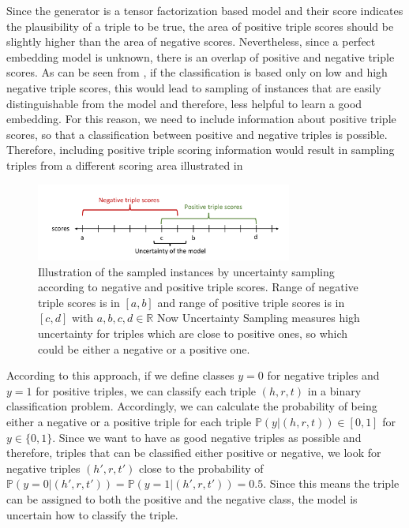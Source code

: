 Since the generator is a tensor factorization based model and their score indicates the plausibility of a triple to be true, the area of positive triple scores should be slightly higher than the area of negative scores.
Nevertheless, since a perfect embedding model is unknown, there is an overlap of positive and negative triple scores.
As can be seen from , if the classification is based only on low and high negative triple scores, this would lead to sampling of instances that are easily distinguishable from the model and therefore, less helpful to learn a good embedding.
For this reason, we need to include information about positive triple scores, so that a classification between positive and negative triples is possible.
Therefore, including positive triple scoring information would result in sampling triples from a different scoring area illustrated in 
\begin{figure}[t]
  \centering
    \includegraphics[width=0.75\textwidth]{figures/positiveVsNegativeApproach.pdf}
  \caption{Illustration of the sampled instances by uncertainty sampling according to negative and positive triple scores.
  Range of negative triple scores is in $[a, b]$ and range of positive triple scores is in  $[c, d]$ with $a,b,c,d \in \mathbb{R}$
  Now Uncertainty Sampling measures high uncertainty for triples which are close to positive ones, so which could be either a negative or a positive one.}
  \label{fig:positiveVsNegativeApproach}
\end{figure}
According to this approach, if we define classes $y = 0$  for negative triples and $y = 1$ for positive triples, we can classify each triple $(h,r,t)$ in a binary classification problem.
Accordingly, we can calculate the probability of being either a negative or a positive triple for each triple $\mathbb{P}(y| (h,r,t)) \in [0,1]$ for $y \in \{0,1\}$.
Since we want to have as good negative triples as possible and therefore, triples that can be classified either positive or negative, we look for negative triples $(h',r,t')$ close to the probability of $\mathbb{P}(y = 0| (h',r,t')) = \mathbb{P}(y = 1| (h',r,t')) = 0.5$.
Since this means the triple can be assigned to both the positive and the negative class, the model is uncertain how to classify the triple.




